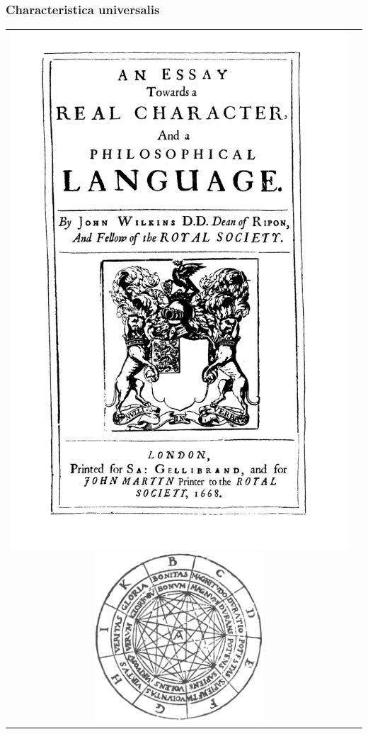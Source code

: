 \documentclass[11pt]{beamer}
\begin{document}
\begin{frame}[fragile]
  \frametitle{Characteristica universalis}

  \begin{tabular}{cc}
  \includegraphics[height=0.75\textheight]{./img/wilkins.jpg}
  \includegraphics[width=0.5\textwidth]{./img/llull.png}
  \end{tabular}
\end{frame}
\end{document}
